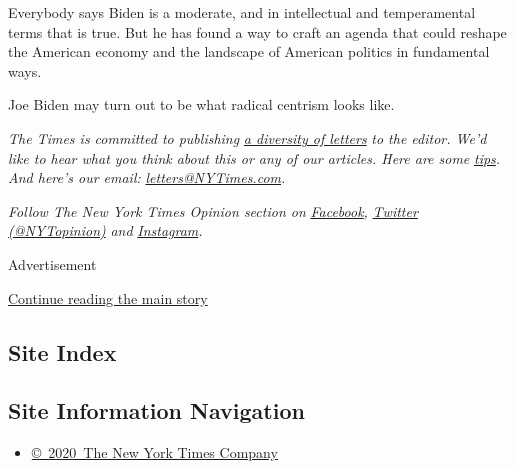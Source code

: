 Everybody says Biden is a moderate, and in intellectual and
temperamental terms that is true. But he has found a way to craft an
agenda that could reshape the American economy and the landscape of
American politics in fundamental ways.

Joe Biden may turn out to be what radical centrism looks like.

\emph{The Times is committed to publishing}
\href{https://www.nytimes3xbfgragh.onion/2019/01/31/opinion/letters/letters-to-editor-new-york-times-women.html}{\emph{a
diversity of letters}} \emph{to the editor. We'd like to hear what you
think about this or any of our articles. Here are some}
\href{https://help.nytimes3xbfgragh.onion/hc/en-us/articles/115014925288-How-to-submit-a-letter-to-the-editor}{\emph{tips}}\emph{.
And here's our email:}
\href{mailto:letters@NYTimes.com}{\emph{letters@NYTimes.com}}\emph{.}

\emph{Follow The New York Times Opinion section on}
\href{https://www.facebookcorewwwi.onion/nytopinion}{\emph{Facebook}}\emph{,}
\href{http://twitter.com/NYTOpinion}{\emph{Twitter (@NYTopinion)}}
\emph{and}
\href{https://www.instagram.com/nytopinion/}{\emph{Instagram}}\emph{.}

Advertisement

\protect\hyperlink{after-bottom}{Continue reading the main story}

\hypertarget{site-index}{%
\subsection{Site Index}\label{site-index}}

\hypertarget{site-information-navigation}{%
\subsection{Site Information
Navigation}\label{site-information-navigation}}

\begin{itemize}
\tightlist
\item
  \href{https://help.nytimes3xbfgragh.onion/hc/en-us/articles/115014792127-Copyright-notice}{©~2020~The
  New York Times Company}
\end{itemize}

